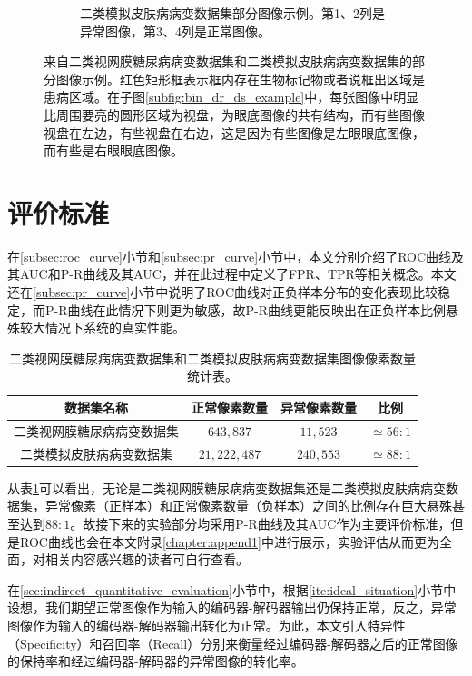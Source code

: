 \begin{figure}[h!]
\begin{subfigure}{0.48\textwidth}
		\caption{二类模拟皮肤病病变数据集部分图像示例。第1、2列是异常图像，第3、4列是正常图像。}
		\label{subfig:bin_simulate_skin_example}
	\end{subfigure}
	\caption{来自二类视网膜糖尿病病变数据集和二类模拟皮肤病病变数据集的部分图像示例。红色矩形框表示框内存在生物标记物或者说框出区域是患病区域。在子图\ref{subfig:bin_dr_ds_example}中，每张图像中明显比周围要亮的圆形区域为视盘，为眼底图像的共有结构，而有些图像视盘在左边，有些视盘在右边，这是因为有些图像是左眼眼底图像，而有些是右眼眼底图像。}
	\label{mul_fig:bin_ds_example}
\end{figure}
\section{评价标准}\label{sec:exper_evaluation_metrics}
在\ref{subsec:roc_curve}小节和\ref{subsec:pr_curve}小节中，本文分别介绍了ROC曲线及其AUC和P-R曲线及其AUC，并在此过程中定义了FPR、TPR等相关概念。本文还在\ref{subsec:pr_curve}小节中说明了ROC曲线对正负样本分布的变化表现比较稳定，而P-R曲线在此情况下则更为敏感，故P-R曲线更能反映出在正负样本比例悬殊较大情况下系统的真实性能。

\begin{table}[h]
	\centering
	\caption{二类视网膜糖尿病病变数据集和二类模拟皮肤病病变数据集图像像素数量统计表。}
	\label{tab:bin_ds_pixel_freqs}
	\begin{tabular}{c|c|c|c}
		\toprule[2pt]
		数据集名称 & 正常像素数量 & 异常像素数量 & 比例 \\
		\midrule[2pt]
		二类视网膜糖尿病病变数据集&  $643,837$ & $11,523$ & $\simeq 56: 1$ \\ \hline
		二类模拟皮肤病病变数据集 & $21,222,487$ & $240,553$ & $\simeq 88: 1$ \\
		\bottomrule[2pt]
	\end{tabular}
\end{table}

\noindent 从表\ref{tab:bin_ds_pixel_freqs}可以看出，无论是二类视网膜糖尿病病变数据集还是二类模拟皮肤病病变数据集，异常像素（正样本）和正常像素数量（负样本）之间的比例存在巨大悬殊甚至达到$88:1$。故接下来的实验部分均采用P-R曲线及其AUC作为主要评价标准，但是ROC曲线也会在本文附录\ref{chapter:append1}中进行展示，实验评估从而更为全面，对相关内容感兴趣的读者可自行查看。

在\ref{sec:indirect_quantitative_evaluation}小节中，根据\ref{ite:ideal_situation}小节中设想，我们期望正常图像作为输入的编码器-解码器输出仍保持正常，反之，异常图像作为输入的编码器-解码器输出转化为正常。为此，本文引入特异性（Specificity）和召回率（Recall）分别来衡量经过编码器-解码器之后的正常图像的保持率和经过编码器-解码器的异常图像的转化率。

